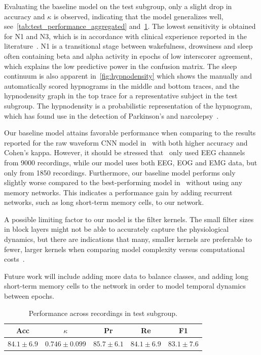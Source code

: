 Evaluating the baseline model on the test subgroup, only a slight drop in accuracy and $\kappa$ is observed, indicating that the model generalizes well, see~\cref{tab:test_performance_aggregated} and~\cref{tab:test_performance_average}.
The lowest sensitivity is obtained for N1 and N3, which is in accordance with clinical experience reported in the literature~\cite{Younes2017, Rosenberg2013, Norman2000, Younes2016}.
N1 is a transitional stage between wakefulness, drowsiness and sleep often containing beta and alpha activity in epochs of low interscorer agreement, which explains the low predictive power in the confusion matrix.
The sleep continuum is also apparent in~\cref{fig:hypnodensity} which shows the manually and automatically scored hypnograms in the middle and bottom traces, and the hypnodensity graph in the top trace for a representative subject in the test subgroup.
The hypnodensity is a probabilistic representation of the hypnogram, which has found use in the detection of Parkinson's and narcolepsy~\cite{Koch2014, Christensen2014, Stephansen2018}.

Our baseline model attains favorable performance when comparing to the results reported for the raw waveform CNN model in~\cite{Biswal2017} with both higher accuracy and Cohen's kappa.
However, it should be stressed that~\cite{Biswal2017} only used EEG channels from 9000 recordings, while our model uses both EEG, EOG and EMG data, but only from 1850 recordings.
Furthermore, our baseline model performs only slightly worse compared to the best-performing model in~\cite{Biswal2017} without using any memory networks.
This indicates a performance gain by adding recurrent networks, such as long short-term memory cells, to our network.

A possible limiting factor to our model is the filter kernels.
The small filter sizes in block layers might not be able to accurately capture the physiological dynamics, but there are indications that many, smaller kernels are preferable to fewer, larger kernels when comparing model complexity versus computational costs~\cite{Szegedy2015}.

Future work will include adding more data to balance classes, and adding long short-term memory cells to the network in order to model temporal dynamics between epochs.
\begin{table}[tb]
    \centering
    \caption[MASSCv1 overall test performance]{Performance across recordings in test subgroup.}
    \label{tab:test_performance_average}
    \begin{tabular}{@{}ccccc@{}}
    \toprule
        Acc              & $\kappa$         & Pr               & Re               & F1               \\ \midrule
        $ 84.1 \pm 6.9 $ & $ 0.746 \pm 0.099 $ & $ 85.7 \pm 6.1 $ & $ 84.1 \pm 6.9 $ & $ 83.1 \pm 7.6 $ \\ \bottomrule
    \end{tabular}
\end{table}

